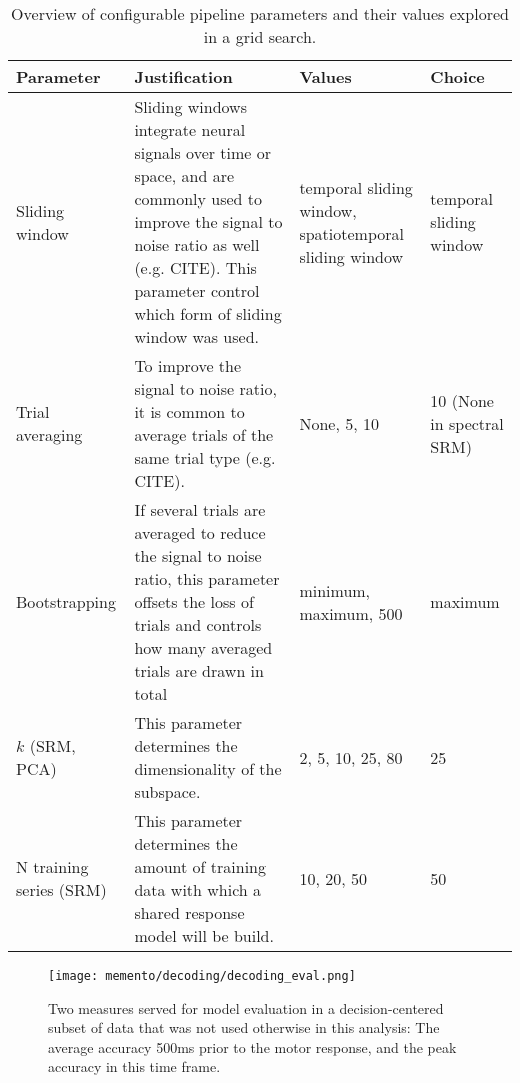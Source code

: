 \begin{center}
	\begin{table}
		\begin{tabular}{p{} p{} p{} p{}}
			\hline
			\textbf{Parameter}	& \textbf{Justification} & \textbf{Values} 	& \textbf{Choice} \\ \hline
			Sliding window 		& Sliding windows integrate neural signals over time or space, and are commonly used to improve the signal to noise ratio as well (e.g. CITE). This parameter control which form of sliding window was used. & temporal sliding window, spatiotemporal sliding window & temporal sliding window \\
			Trial averaging 	& To improve the signal to noise ratio, it is common to average trials of the same trial type (e.g. CITE). & None, 5, 10 & 10 (None in spectral SRM) \\
			Bootstrapping 		& If several trials are averaged to reduce the signal to noise ratio, this parameter offsets the loss of trials and controls how many averaged trials are drawn in total & minimum, maximum, 500 & maximum \\
			$k$ (SRM, PCA)		& This parameter determines the dimensionality of the subspace. & 2, 5, 10, 25, 80 & 25	 \\
			N training series (SRM) & This parameter determines the amount of training data with which a shared response model will be build. 	& 10, 20, 50 & 50
		\end{tabular}
		\caption[Overview of pipeline parameters]{Overview of configurable pipeline parameters and their values explored in a grid search.}
		\label{tab:gridsearch}
	\end{table}
\end{center}
\begin{figure}[H]
	\centering
	\texttt{[image: memento/decoding/decoding\_eval.png]}
	\caption[Decoding evaluation]{Two measures served for model evaluation in a decision-centered subset of data that was not used otherwise in this analysis: The average accuracy 500ms prior to the motor response, and the peak accuracy in this time frame.}
	\label{fig:opti-eval}
\end{figure}

